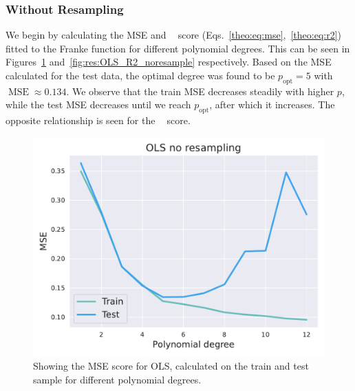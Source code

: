 \documentclass[twocolumn,english,notitlepage]{article}
\DeclareMathOperator{\mse}{MSE}
\DeclareMathOperator{\Rsquared}{R^2}
\newcommand{\msub}[2]{\ensuremath{{#1}_\text{#2}}}
\begin{document}
            \subsubsection*{Without Resampling}
                We begin by calculating the MSE and $\Rsquared$ score (Eqs.~\ref{theo:eq:mse},~\ref{theo:eq:r2}) fitted to the Franke function for different polynomial degrees. This can be seen in Figures~\ref{fig:res:OLS_mse_noresample} and~\ref{fig:res:OLS_R2_noresample} respectively. Based on the MSE calculated for the test data, the optimal degree was found to be $\msub{p}{opt} = 5$ with $\mse \approx 0.134$. We observe that the train MSE decreases steadily with higher $p$, while the test MSE decreases until we reach $\msub{p}{opt}$, after which it increases. The opposite relationship is seen for the $\Rsquared$ score.   
                \begin{figure}[H]
                    \centering
                    \includegraphics[width=\linewidth]{OLS_mse_noresample.pdf}
                    \caption{Showing the MSE score for OLS, calculated on the train and test sample for different polynomial degrees.}
                    \label{fig:res:OLS_mse_noresample}
                \end{figure}
\end{document}
